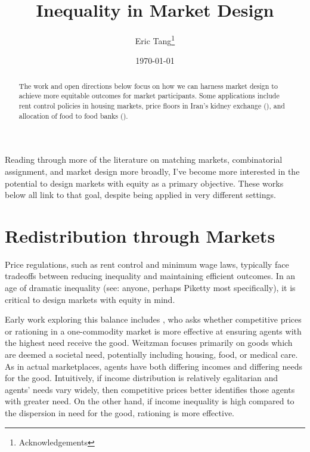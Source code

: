 \documentclass[JEL]{AEA}
\begin{document}
\title{Inequality in Market Design}
\author{Eric Tang\thanks{%
Acknowledgements}}
\date{\today}
\JEL{}
\Keywords{}

\begin{abstract}
The work and open directions below focus on how we can harness market design to achieve more equitable outcomes for market participants. Some applications include rent control policies in housing markets, price floors in Iran's kidney exchange (\cite{dworczak-2020}), and allocation of food to food banks (\cite{prendergast-2017}).
\end{abstract}

\maketitle

Reading through more of the literature on matching markets, combinatorial assignment, and market design more broadly, I've become more interested in the potential to design markets with equity as a primary objective. These works below all link to that goal, despite being applied in very different settings.

\section{Redistribution through Markets}

Price regulations, such as rent control and minimum wage laws, typically face tradeoffs between reducing inequality and maintaining efficient outcomes. In an age of dramatic inequality (see: anyone, perhaps Piketty most specifically), it is critical to design markets with equity in mind.

Early work exploring this balance includes \cite{weitzman-1977}, who asks whether competitive prices or rationing in a one-commodity market is more effective at ensuring agents with the highest need receive the good. Weitzman focuses primarily on goods which are deemed a societal need, potentially including housing, food, or medical care. As in actual marketplaces, agents have both differing incomes and differing needs for the good. Intuitively, if income distribution is relatively egalitarian and agents' needs vary widely, then competitive prices better identifies those agents with greater need. On the other hand, if income inequality is high compared to the dispersion in need for the good, rationing is more effective.
\end{document}
